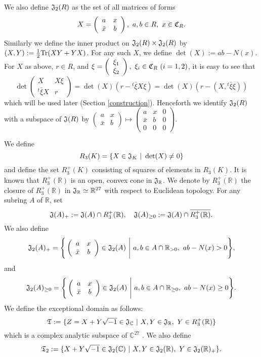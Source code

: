 \documentclass[11pt]{amsart}
\numberwithin{equation}{section}
\theoremstyle{definition}
\begin{document}
We also define $\frak{J}_2(R)$ as the set of all matrices of forms  
$$X=\left(\begin{array}{cc}
a& x  \\
\bar{x} & b 
\end{array}\right),\ a,b\in R,\ x\in \frak C_R.$$
Similarly we define the inner product on $\frak{J}_2(R)\times \frak{J}_2(R)$ 
by $(X,Y):=\frac 12{{\rm Tr}}(XY+YX)$. 
For any such $X$, we define $\det(X):=ab-N(x).$
For $X$ as above, $r\in R$, and $\xi=\left(\begin{array}{c}
\xi_1 \\
\xi_2
\end{array}\right),\ \xi_i\in \frak C_R\ (i=1,2)$, it is easy to see that 
\begin{equation}\label{formula}
\det\left(\begin{array}{cc}
X & X\xi \\
{}^t\bar{\xi}X & r
\end{array}\right)=
\det(X)(r-{}^t\bar{\xi}X\xi)=\det(X)(r-(X,{}^t\bar{\xi}\xi))
\end{equation}
which will be used later (Section \ref{construction}). 
Henceforth we identify $\frak J_2(R)$ with a subspace of $\frak J(R)$ by 
$\left(\begin{array}{cc}
a& x  \\
\bar{x} & b 
\end{array}\right)\mapsto \left(\begin{array}{ccc}
a& x & 0 \\
\bar{x} & b & 0 \\
0& 0 & 0
\end{array}\right).$

We define 
$$R_3(K)=\{X\in \frak J_K\ |\ \det(X)\not=0 \}
$$ 
and define the set $R^+_3(K)$ consisting of squares of elements in $R_3(K)$. 
It is known that $R^+_3({\mathbb{R}})$ is an open, convex cone in $\frak J_{\mathbb{R}}$. 
We denote by $\overline{R^+_3({\mathbb{R}})}$ the closure of $R^+_3({\mathbb{R}})$ in $\frak J_{\mathbb{R}}\simeq {\mathbb{R}}^{27}$ 
with respect to Euclidean topology. For any subring $A$ of ${\mathbb{R}}$, set 
$$\frak J(A)_+:=\frak J(A)\cap R^+_3({\mathbb{R}}),\quad \frak J(A)_{\ge 0}:=\frak J(A)\cap \overline{R^+_3({\mathbb{R}})}.
$$
We also define  
$$\frak J_2(A)_{+}=\Bigg\{\left(\begin{array}{cc}
a& x  \\
\bar{x} & b 
\end{array}\right)\in\frak J_2(A) \ \Bigg|\ a,b\in A\cap {\mathbb{R}}_{>0},\ ab-N(x)>0  \Bigg\},$$
and  
$$\frak J_2(A)_{\ge 0}=\Bigg\{\left(\begin{array}{cc}
a& x  \\
\bar{x} & b 
\end{array}\right)\in \frak J_2(A)\ \Bigg|\ a,b\in A\cap {\mathbb{R}}_{\ge 0},\ ab-N(x)\ge 0  \Bigg\}.$$
We define the exceptional domain as follows:
$$\frak T:=\{Z=X+Y\sqrt{-1}\in \frak J_{\mathbb{C}}\ |\ X,Y\in \frak J_{\mathbb{R}},\ Y\in R^+_3({\mathbb{R}})\}$$
which is a complex analytic subspace of ${\mathbb{C}}^{27}$ . We also define 
$$\frak T_2:=\{X+Y\sqrt{-1}\in \frak J_2({\mathbb{C}})\ |\ X,Y\in \frak J_2({\mathbb{R}}),\ Y\in \frak J_2({\mathbb{R}})_+\}.
$$
\end{document}
